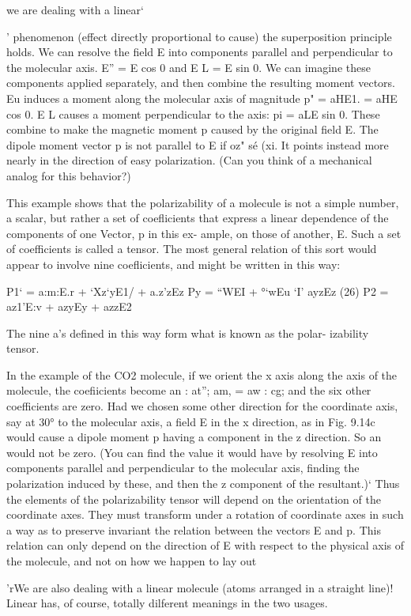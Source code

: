 we are dealing with a linear‘{' phenomenon (effect directly proportional
to cause) the superposition principle holds. We can resolve
the field E into components parallel and perpendicular to the molecular
axis. E'' = E cos 0 and E L = E sin 0. We can imagine these
components applied separately, and then combine the resulting
moment vectors. Eu induces a moment along the molecular axis of
magnitude p" = aHE1. = aHE cos 0. E L causes a moment perpendicular
to the axis: pi = aLE sin 0. These combine to make the magnetic
moment p caused by the original field E. The dipole moment
vector p is not parallel to E if oz" sé (xi. It points instead more nearly
in the direction of easy polarization. (Can you think of a mechanical
analog for this behavior?)

This example shows that the polarizability of a molecule is not a
simple number, a scalar, but rather a set of coeflicients that express
a linear dependence of the components of one Vector, p in this ex-
ample, on those of another, E. Such a set of coefficients is called a
tensor. The most general relation of this sort would appear to involve
nine coeflicients, and might be written in this way:

P1‘ = a:m:E.r + ‘Xz‘yE1/ + a.z'zEz
Py = ``WEI + °‘wEu ‘I' ayzEz (26)
P2 = az1'E:v + azyEy + azzE2

The nine a's defined in this way form what is known as the polar-
izability tensor.

In the example of the CO2 molecule, if we orient the x axis along
the axis of the molecule, the coefiicients become an : at'';
am, = aw : cg; and the six other coefficients are zero. Had we
chosen some other direction for the coordinate axis, say at 30° to the
molecular axis, a field E in the x direction, as in Fig. 9.14c would cause
a dipole moment p having a component in the z direction. So an
would not be zero. (You can find the value it would have by resolving
E into components parallel and perpendicular to the molecular
axis, finding the polarization induced by these, and then the z component
of the resultant.)‘ Thus the elements of the polarizability
tensor will depend on the orientation of the coordinate axes. They
must transform under a rotation of coordinate axes in such a way as
to preserve invariant the relation between the vectors E and p. This
relation can only depend on the direction of E with respect to the
physical axis of the molecule, and not on how we happen to lay out

'rWe are also dealing with a linear molecule (atoms arranged in a straight line)!
Linear has, of course, totally dilferent meanings in the two usages.

}

